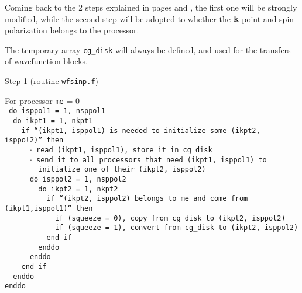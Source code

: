 \documentclass{article}
\begin{document}
Coming back to the 2 steps explained in pages \pageref{sec:G2} and 
\pageref{sec:G3}, the first one will be strongly modified, while the
second step will be adopted to whether the ${\bf k}$-point and
spin-polarization belongs to the processor.

The temporary array {\tt cg\_disk} will always be defined, and used for
the transfers of wavefunction blocks.

\label{sec:H3}
\underline{Step 1} (routine {\tt wfsinp.f})

For processor {\tt me} = 0\\
{\tt
do isppol1 = 1, nsppol1 \\
\, do ikpt1 = 1, nkpt1 \\
\, \, if ``(ikpt1, isppol1) is needed to initialize some (ikpt2, isppol2)'' then \\
\, \, \, $\cdot$ read (ikpt1, isppol1), store it in cg\_disk \\
\, \, \, $\cdot$ send it to all processors that need (ikpt1, isppol1) to \\
\, \, \, \, initialize one of their (ikpt2, isppol2) \\
\, \, \, do isppol2 = 1, nsppol2 \\
\, \, \, \, do ikpt2 = 1, nkpt2 \\
\, \, \, \, \, if ``(ikpt2, isppol2) belongs to me and come from (ikpt1,isppol1)'' then \\
\, \, \, \, \, \, if (squeeze = 0), copy from cg\_disk to (ikpt2, isppol2) \\
\, \, \, \, \, \, if (squeeze = 1), convert from cg\_disk to (ikpt2, isppol2) \\
\, \, \, \, \, end if \\
\, \, \, \, enddo \\
\, \, \, enddo \\
\, \, end if \\
\, enddo \\
enddo}
\end{document}
